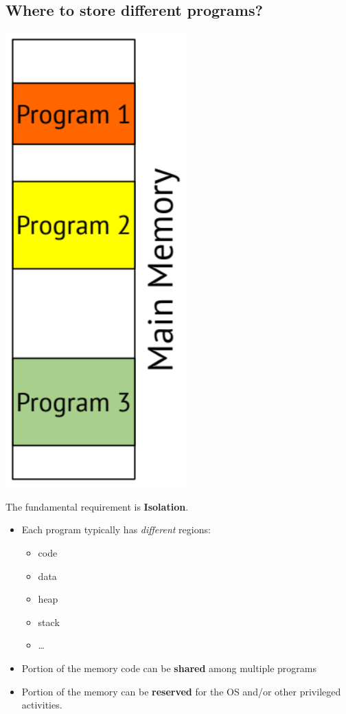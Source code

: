 \documentclass[10pt]{article}
\begin{document}
\subsection*{Where to store different programs?}
\begin{center}
    \includegraphics*[scale=0.8]{W7_6.png}
\end{center}
The fundamental requirement is \textbf{Isolation}.
\begin{itemize}
    \item Each program typically has \textit{different} regions:
    \begin{itemize}
        \item code
        \item data
        \item heap
        \item stack
        \item \dots
    \end{itemize}
    \item Portion of the memory code can be \textbf{shared} among multiple programs
    \item Portion of the memory can be \textbf{reserved} for the OS and/or other privileged activities.
\end{itemize}
\end{document}
